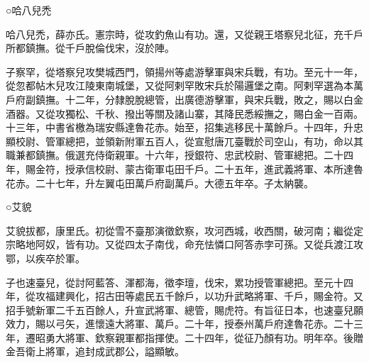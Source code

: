 \begin{pinyinscope}
 ○哈八兒禿



 哈八兒禿，薛亦氏。憲宗時，從攻釣魚山有功。還，又從親王塔察兒北征，充千戶所都鎮撫。從千戶脫倫伐宋，沒於陣。



 子察罕，從塔察兒攻樊城西門，領揚州等處游擊軍與宋兵戰，有功。至元十一年，從忽都帖木兒攻江陵東南城堡，又從阿剌罕敗宋兵於陽邏堡之南。阿剌罕選為本萬戶府副鎮撫。十二年，分隸脫脫總管，出廣德游擊軍，與宋兵戰，敗之，賜以白金酒器。又從攻獨松、千秋、撥出等關及諸山寨，其降民悉綏撫之，賜白金一百兩。十三年，中書省檄為瑞安縣達魯花赤。始至，招集逃移民十萬餘戶。十四年，升忠顯校尉、管軍總把，並領新附軍五百人，從宣慰唐兀臺戰於司空山，有功，命以其職兼都鎮撫。俄選充侍衛親軍。十六年，授銀符、忠武校尉、管軍總把。二十四年，賜金符，授承信校尉、蒙古衛軍屯田千戶。二十五年，進武義將軍、本所達魯花赤。二十七年，升左翼屯田萬戶府副萬戶。大德五年卒。子太納襲。



 ○艾貌



 艾貌拔都，康里氏。初從雪不臺那演徵欽察，攻河西城，收西關，破河南；繼從定宗略地阿奴，皆有功。又從四太子南伐，命充怯憐口阿答赤孛可孫。又從兵渡江攻鄂，以疾卒於軍。



 子也速臺兒，從討阿藍答、渾都海，徵李璮，伐宋，累功授管軍總把。至元十四年，從攻福建興化，招古田等處民五千餘戶，以功升武略將軍、千戶，賜金符。又招手號新軍二千五百餘人，升宣武將軍、總管，賜虎符。有旨征日本，也速臺兒願效力，賜以弓矢，進懷遠大將軍、萬戶。二十年，授泰州萬戶府達魯花赤。二十三年，遷昭勇大將軍、欽察親軍都指揮使。二十四年，從征乃顏有功。明年卒。後贈金吾衛上將軍，追封成武郡公，謚顯敏。



\end{pinyinscope}